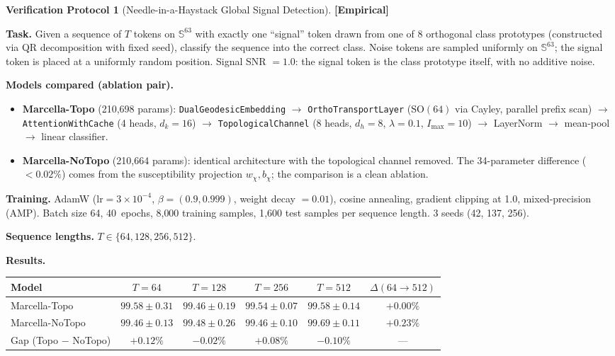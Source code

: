 \documentclass[11pt,a4paper]{article}
\theoremstyle{definition}
\newtheorem{protocol}[theorem]{Verification Protocol}
\theoremstyle{remark}
\newcommand{\Sphere}{\mathbb{S}}
\newcommand{\SO}{\mathrm{SO}}
\newcommand{\statusempirical}{\textcolor{purple!70!black}{\textbf{[Empirical]}}}
\begin{document}
\begin{protocol}[Needle-in-a-Haystack Global Signal 
Detection]\label{prot:topo_needle}
\statusempirical

\textbf{Task.} Given a sequence of $T$ tokens on 
$\Sphere^{63}$ with exactly one ``signal'' token drawn from 
one of 8 orthogonal class prototypes (constructed via QR 
decomposition with fixed seed), classify the sequence into 
the correct class. Noise tokens are sampled uniformly on 
$\Sphere^{63}$; the signal token is placed at a uniformly 
random position. Signal SNR $= 1.0$: the signal token is 
the class prototype itself, with no additive noise.

\textbf{Models compared (ablation pair).}
\begin{itemize}[nosep]
  \item \textbf{Marcella-Topo} (210{,}698 params): 
  \texttt{DualGeodesicEmbedding} $\to$ 
  \texttt{OrthoTransportLayer} ($\SO(64)$ via Cayley, 
  parallel prefix scan) $\to$ \texttt{AttentionWithCache} 
  (4 heads, $d_k = 16$) $\to$ \texttt{TopologicalChannel} 
  (8 heads, $d_h = 8$, $\lambda = 0.1$, $I_{\max} = 10$) 
  $\to$ LayerNorm $\to$ mean-pool $\to$ linear classifier.
  \item \textbf{Marcella-NoTopo} (210{,}664 params): 
  identical architecture with the topological channel 
  removed. The 34-parameter difference ($< 0.02\%$) comes 
  from the susceptibility projection $w_\chi, b_\chi$; the 
  comparison is a clean ablation.
\end{itemize}

\textbf{Training.} AdamW ($\mathrm{lr} = 3 \times 10^{-4}$, 
$\beta = (0.9, 0.999)$, weight decay $= 0.01$), cosine 
annealing, gradient clipping at 1.0, mixed-precision (AMP). 
Batch size 64, 40~epochs, 8{,}000 training samples, 
1{,}600 test samples per sequence length. 3 seeds 
(42, 137, 256).

\textbf{Sequence lengths.} $T \in \{64, 128, 256, 512\}$.

\textbf{Results.}

\begin{center}
\begin{tabular}{lccccc}
\toprule
Model & $T = 64$ & $T = 128$ & $T = 256$ & $T = 512$ &
$\Delta(64 \to 512)$ \\
\midrule
Marcella-Topo & $99.58 \pm 0.31$ & $99.46 \pm 0.19$ & 
$99.54 \pm 0.07$ & $99.58 \pm 0.14$ & $+0.00\%$ \\
Marcella-NoTopo & $99.46 \pm 0.13$ & $99.48 \pm 0.26$ & 
$99.46 \pm 0.10$ & $99.69 \pm 0.11$ & $+0.23\%$ \\
\midrule
Gap (Topo $-$ NoTopo) & $+0.12\%$ & $-0.02\%$ & 
$+0.08\%$ & $-0.10\%$ & --- \\
\bottomrule
\end{tabular}
\end{center}


\end{protocol}
\end{document}
